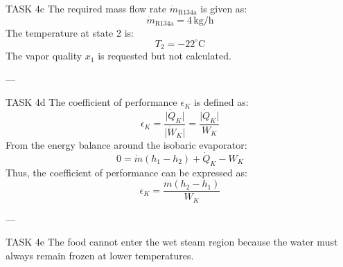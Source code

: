 TASK 4c  
The required mass flow rate \( \dot{m}_{\text{R134a}} \) is given as:  
\[
\dot{m}_{\text{R134a}} = 4 \, \text{kg/h}
\]  
The temperature at state 2 is:  
\[
T_2 = -22^\circ\text{C}
\]  
The vapor quality \( x_1 \) is requested but not calculated.

---

TASK 4d  
The coefficient of performance \( \epsilon_K \) is defined as:  
\[
\epsilon_K = \frac{\lvert \dot{Q}_K \rvert}{\lvert \dot{W}_K \rvert} = \frac{\lvert \dot{Q}_K \rvert}{W_K}
\]  
From the energy balance around the isobaric evaporator:  
\[
0 = \dot{m} (h_1 - h_2) + \dot{Q}_K - W_K
\]  
Thus, the coefficient of performance can be expressed as:  
\[
\epsilon_K = \frac{\dot{m} (h_2 - h_1)}{W_K}
\]

---

TASK 4e  
The food cannot enter the wet steam region because the water must always remain frozen at lower temperatures.